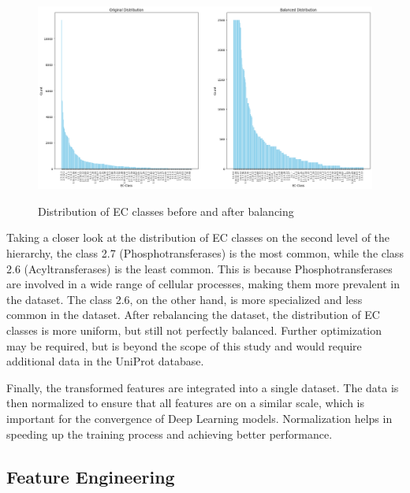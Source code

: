 \begin{figure}[hbt]
    \centering
    \begin{minipage}[t]{\textwidth}
    \caption{Distribution of EC classes before and after balancing}
    \includegraphics[width=1\textwidth]{img/ec-distribution-comparison.png}
    \label{fig:ec-distribution-comparison}
    \end{minipage}
\end{figure}

Taking a closer look at the distribution of EC classes on the second level of the hierarchy, the class 2.7 (Phosphotransferases) is the most common, while the class 2.6 (Acyltransferases) is the least common. This is because Phosphotransferases are involved in a wide range of cellular processes, making them more prevalent in the dataset. The class 2.6, on the other hand, is more specialized and less common in the dataset. After rebalancing the dataset, the distribution of EC classes is more uniform, but still not perfectly balanced. Further optimization may be required, but is beyond the scope of this study and would require additional data in the UniProt database.

Finally, the transformed features are integrated into a single dataset. The data is then normalized to ensure that all features are on a similar scale, which is important for the convergence of Deep Learning models. Normalization helps in speeding up the training process and achieving better performance. \autocite{ioffeBatchNormalizationAccelerating2015}

\subsection{Feature Engineering}
\label{sec:Feature Engineering}

